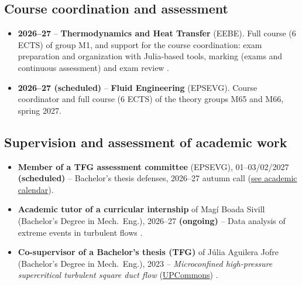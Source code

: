 \documentclass[11pt]{article}
\newcommand{\NEW}[1]{\iffinal #1\else{\color{red}#1}\fi} %
\begin{document}
\subsection{Course coordination and assessment}
\begin{itemize}
  \item \textbf{2026--27} -- \textbf{Thermodynamics and Heat Transfer} (EEBE). Full course
  (6 ECTS) of group M1, and support \NEW{for the course} coordination: exam preparation and
  organization with Julia-based tools, marking (exams and continuous assessment) and exam
  review
  .
  \item \textbf{2026--27 (scheduled)} -- \textbf{Fluid Engineering} (EPSEVG). Course
  coordinator and full course (6 ECTS) of the theory groups M65 and M66, spring 2027.
\end{itemize}

\subsection{Supervision and assessment of academic work}
\begin{itemize}
  \item \textbf{Member of a TFG assessment committee} (EPSEVG), 01--03/02/2027
  \textbf{(scheduled)} -- Bachelor's thesis defenses, 2026--27 autumn call
  (\href{https://drive.google.com/file/d/1TGufsft81vD3qv27ZWpKPmW_KSVtG-hR/view}{see academic calendar}).
  \item \textbf{Academic tutor of a curricular internship} of Mag\'i Boada Sivill
  (Bachelor's Degree in Mech.\ Eng.), 2026--27 \textbf{(ongoing)} -- Data analysis of
  extreme events in turbulent flows .
  \item \textbf{Co-supervisor of a Bachelor's thesis (TFG)} of J\'ulia Aguilera Jofre
  (Bachelor's Degree in Mech.\ Eng.), 2023 -- \emph{Microconfined high-pressure
  supercritical turbulent square duct flow}
  (\href{https://hdl.handle.net/2117/395741}{UPCommons})
  .
\end{itemize}
\end{document}
